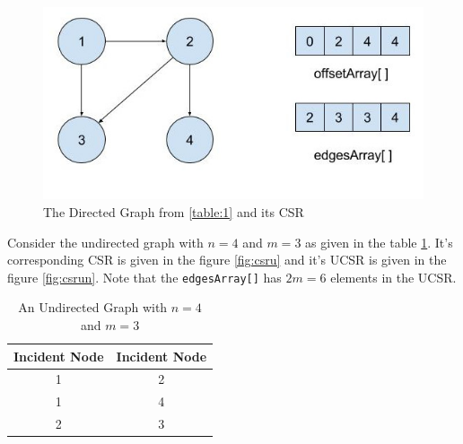 \documentclass[MTech]{iitmdiss}
\begin{document}
\begin{figure}[h]
    \centering
    \includegraphics[width=\textwidth,scale=0.6,keepaspectratio=true]{csrdirected.jpg}
    \caption{
       The Directed Graph from \ref{table:1} and its CSR
    }
    \label{fig:csrd}
\end{figure}

Consider the undirected graph with $n=4$ and $m=3$ as given in the table \ref{table:2}. It's corresponding CSR is given in the figure \ref{fig:csru} and it's UCSR is given in the figure \ref{fig:csrun}. Note that the \verb+edgesArray[]+ has $2m = 6$ elements in the UCSR.

\begin{table}[h!]
\centering
\begin{tabular}{||c|c||} 
 \hline
 Incident Node & Incident Node \\ [0.5ex] 
 \hline\hline
 1 & 2\\
 \hline
 1 & 4\\
 \hline
 2 & 3\\
 \hline
\end{tabular}
\caption{An Undirected Graph with $n=4$ and $m=3$}
\label{table:2}
\end{table}
\end{document}

